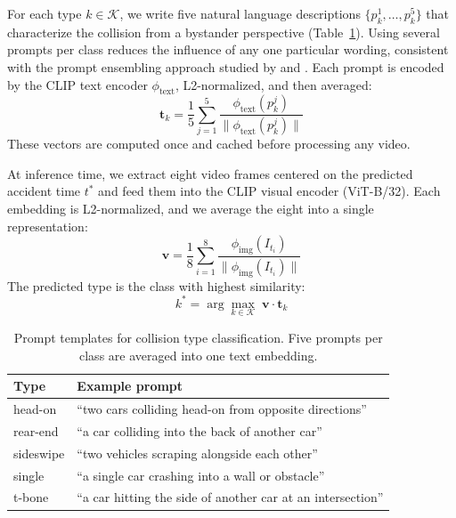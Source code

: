 \documentclass{article}
\begin{document}
For each type $k \in \mathcal{K}$, we write five natural language descriptions $\{p_k^1, \ldots, p_k^5\}$ that characterize the collision from a bystander perspective (Table~\ref{tab:prompts}). Using several prompts per class reduces the influence of any one particular wording, consistent with the prompt ensembling approach studied by \citet{radford2021learning} and \citet{zhou2022learning}. Each prompt is encoded by the CLIP text encoder $\phi_{\text{text}}$, L2-normalized, and then averaged:
\begin{equation}
    \mathbf{t}_k = \frac{1}{5} \sum_{j=1}^{5} \frac{\phi_{\text{text}}(p_k^j)}{\|\phi_{\text{text}}(p_k^j)\|}
    \label{eq:textfeat}
\end{equation}
These vectors are computed once and cached before processing any video.

At inference time, we extract eight video frames centered on the predicted accident time $t^{*}$ and feed them into the CLIP visual encoder (ViT-B/32). Each embedding is L2-normalized, and we average the eight into a single representation:
\begin{equation}
    \mathbf{v} = \frac{1}{8} \sum_{i=1}^{8} \frac{\phi_{\text{img}}(I_{t_i})}{\|\phi_{\text{img}}(I_{t_i})\|}
    \label{eq:imgfeat}
\end{equation}
The predicted type is the class with highest similarity:
\begin{equation}
    k^{*} = \arg\max_{k \in \mathcal{K}} \; \mathbf{v} \cdot \mathbf{t}_k
    \label{eq:classify}
\end{equation}

\begin{table}[t]
\centering
\small
\caption{Prompt templates for collision type classification. Five prompts per class are averaged into one text embedding.}
\label{tab:prompts}
\begin{tabular}{@{}ll@{}}
\toprule
\textbf{Type} & \textbf{Example prompt} \\
\midrule
head-on   & ``two cars colliding head-on from opposite directions'' \\
rear-end  & ``a car colliding into the back of another car'' \\
sideswipe & ``two vehicles scraping alongside each other'' \\
single    & ``a single car crashing into a wall or obstacle'' \\
t-bone    & ``a car hitting the side of another car at an intersection'' \\
\bottomrule
\end{tabular}
\end{table}
\end{document}
